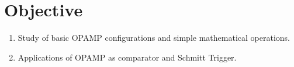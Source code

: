 \section{Objective}
\begin{enumerate}
    \item Study of basic OPAMP configurations and simple mathematical operations.
    \item Applications of OPAMP as comparator and Schmitt Trigger.
\end{enumerate}